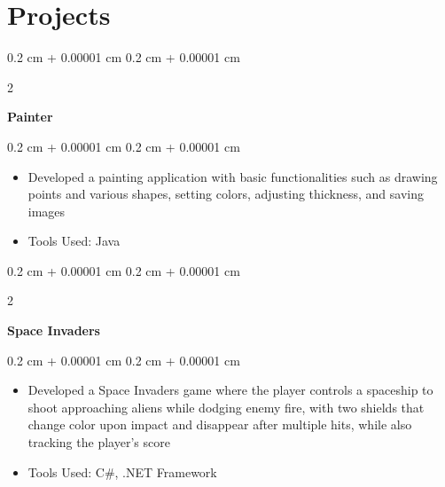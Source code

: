 \documentclass[10pt, letterpaper]{article}
\newenvironment{highlights}{
    \begin{itemize}[
        topsep=0.10 cm,
        parsep=0.10 cm,
        partopsep=0pt,
        itemsep=0pt,
        leftmargin=0.4 cm + 10pt
    ]
}{
    \end{itemize}
} %
\newenvironment{onecolentry}{
    \begin{adjustwidth}{
        0.2 cm + 0.00001 cm
    }{
        0.2 cm + 0.00001 cm
    }
}{
    \end{adjustwidth}
} %
\newenvironment{twocolentry}[2][]{
    \onecolentry
    \def\secondColumn{#2}
    \setcolumnwidth{\fill, 4.5 cm}
    \begin{paracol}{2}
}{
    \switchcolumn \raggedleft \secondColumn
    \end{paracol}
    \endonecolentry
} %
\let\hrefWithoutArrow\href
\renewcommand{\href}[2]{\hrefWithoutArrow{#1}{\ifthenelse{\equal{#2}{}}{ }{#2 }\raisebox{.15ex}{\footnotesize \faExternalLink*}}}
\begin{document}
    \section{Projects}



        
        \begin{twocolentry}{
            
            
        \textit{\href{https://github.com/sabinasagova/painter}{\footnotesize\faGithub}}}
            \textbf{Painter}
        \end{twocolentry}

        \vspace{0.10 cm}
        \begin{onecolentry}
            \begin{highlights}
                \item Developed a painting application with basic functionalities such as drawing points and various shapes, setting colors, adjusting thickness, and saving images
                \item Tools Used: Java
            \end{highlights}
        \end{onecolentry}


        \vspace{0.2 cm}

        \begin{twocolentry}{
            
            
        \textit{\href{https://github.com/sabinasagova/spaceInvaders}{\footnotesize\faGithub}}}
            \textbf{Space Invaders}
        \end{twocolentry}
        \vspace{0.10 cm}

        \begin{onecolentry}
            \begin{highlights}
                 \item Developed a Space Invaders game where the player controls a spaceship to shoot approaching aliens while dodging enemy fire, with two shields that change color upon impact and disappear after multiple hits, while also tracking the player's score
                \item Tools Used: C\#, .NET Framework
            \end{highlights}
        \end{onecolentry}

            
            
\end{document}
